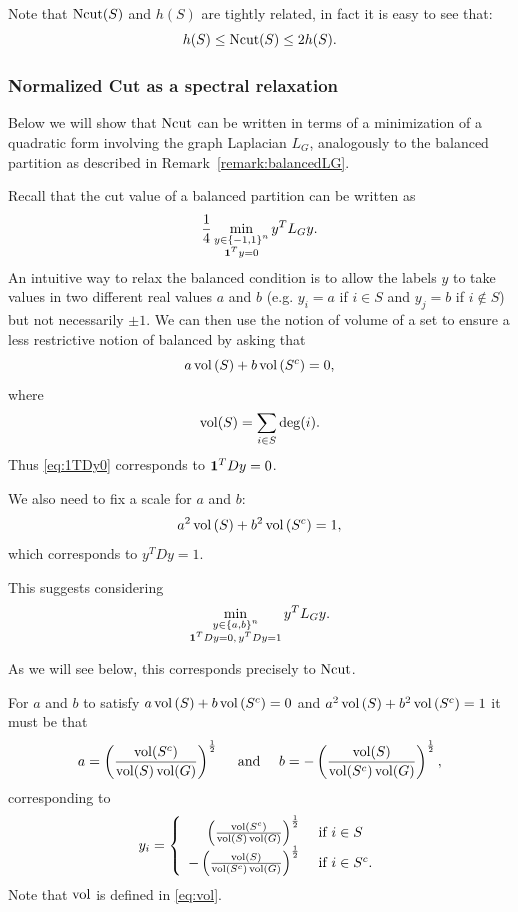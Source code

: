 Note that $\operatorname{Ncut}(S)$ and $h(S)$ are tightly related, in fact it is easy to see that:
\[
h(S) \leq \operatorname{Ncut}(S) \leq 2h(S).
\]




\subsubsection{Normalized Cut as a spectral relaxation}

Below we will show that $\operatorname{Ncut}$ can be written in terms of a minimization of a quadratic form involving the graph Laplacian $L_G$, analogously to the balanced partition as described in Remark~\ref{remark:balancedLG}.

Recall that the cut value of a balanced partition can be written as
\[
\frac14 \min_{\substack{y\in\{-1,1\}^n \\ \mathbf{1}^Ty = 0}}  y^TL_Gy.
\]
An intuitive way to relax the balanced condition is to allow the labels $y$ to take values in two different real values $a$ and $b$ (e.g. $y_i = a$ if $i\in S$ and $y_j = b$ if $i\notin S$) but not necessarily $\pm1$. We can then use the notion of volume of a set to ensure a less restrictive notion of balanced by asking that
\begin{equation}\label{eq:1TDy0}
a\operatorname{vol}\left(S\right) + b\operatorname{vol}\left(S^c\right) = 0,
\end{equation}
where
\begin{equation}\label{eq:vol}
\operatorname{vol}(S) = \sum_{i\in S} \deg(i).
\end{equation}
Thus \eqref{eq:1TDy0} corresponds to $\mathbf{1}^TDy = 0$.

We also need to fix a scale for $a$ and $b$:
\[
a^2\operatorname{vol}\left(S\right) + b^2\operatorname{vol}\left(S^c\right) = 1,
\]
which corresponds to $y^TDy = 1$.

This suggests considering
\begin{equation*}
\min_{\substack{y\in\{a,b\}^n \\ \mathbf{1}^TDy = 0,\, y^TDy = 1}}  y^TL_Gy.
\end{equation*}

As we will see below, this corresponds precisely to $\operatorname{Ncut}$.

\begin{proposition}
For $a$ and $b$ to satisfy $a\operatorname{vol}\left(S\right) + b\operatorname{vol}\left(S^c\right) = 0$ and $a^2\operatorname{vol}\left(S\right) + b^2\operatorname{vol}\left(S^c\right) = 1$ it must be that
\[
a = \left(  \frac{\operatorname{vol}(S^c)}{\operatorname{vol}(S)\operatorname{vol}(G)}\right)^{\frac12} \quad \text{ and }\quad b =  -  \left(  \frac{\operatorname{vol}(S)}{\operatorname{vol}(S^c)\operatorname{vol}(G)}\right)^{\frac12}  ,
\]
corresponding to
\[
y_i = \left\{ \begin{array}{rl}  \left(  \frac{\operatorname{vol}(S^c)}{\operatorname{vol}(S)\operatorname{vol}(G)}\right)^{\frac12} & \text{ if } i\in S \\
  -  \left(  \frac{\operatorname{vol}(S)}{\operatorname{vol}(S^c)\operatorname{vol}(G)}\right)^{\frac12}  & \text{ if } i\in S^c.     \end{array}   \right.
\]
Note that $\operatorname{vol}$ is defined in \eqref{eq:vol}.
\end{proposition}


